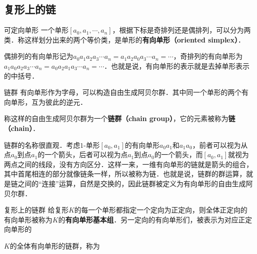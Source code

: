 



\subsection{复形上的链}

\begin{definition}{可定向单形}
一个单形$[a_0, a_1, \cdots, a_n]$，根据下标是奇排列还是偶排列，可以分为两类．称这样划分出来的两个等价类，是单形的\textbf{有向单形（oriented simplex）}．

偶排列的有向单形记为$a_0a_1a_2a_3\cdots a_n=a_1a_2a_0a_3\cdots a_n=\cdots$，奇排列的有向单形为$a_1a_0a_2a_3\cdots a_n=a_0a_2a_1a_3\cdots a_n=\cdots$．也就是说，有向单形的表示就是去掉单形表示的中括号．
\end{definition}

\begin{definition}{链群}
有向单形作为字母，可以构造自由生成阿贝尔群．其中同一个单形的两个有向单形，互为彼此的逆元．

称这样的自由生成阿贝尔群为一个\textbf{链群（chain group）}，它的元素被称为\textbf{链（chain）}．
\end{definition}

链群的名称很直观．考虑$1$-单形$[a_0, a_1]$的有向单形$a_0a_1$和$a_1a_0$，前者可以视为从点$a_0$到点$a_1$的一个箭头，后者可以视为点$a_1$到点$a_0$的一个箭头，而$[a_0, a_1]$就视为两点之间的线段，没有方向区分．这样一来，一维有向单形的链就是箭头的组合，其中首尾相连的部分就像链条一样，所以被称为链．也就是说，链群的群运算，就是链之间的“连接”运算，自然是交换的，因此链群被定义为有向单形的自由生成阿贝尔群．

\begin{definition}{复形上的链群}
给复形$K$的每一个单形都指定一个定向为正定向，则全体正定向的有向单形被称为$K$的\textbf{有向单形基本组}．另一定向的有向单形们，被表示为对应正定向单形的\tex

$K$的全体有向单形的链群，称为
\end{definition}












